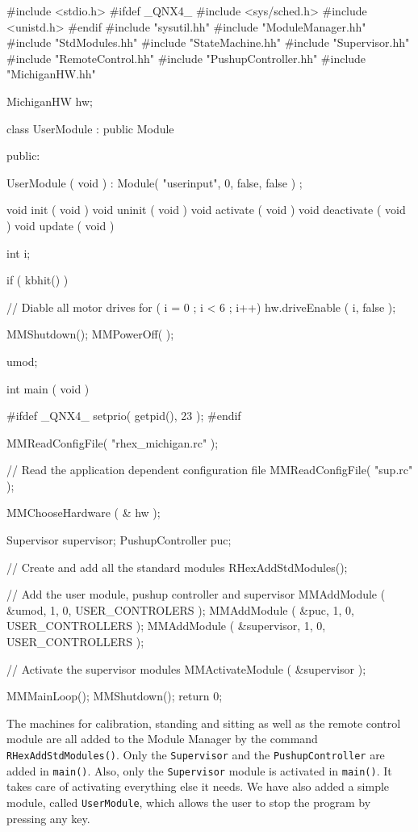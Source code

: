 \begin{codesegment}
#include <stdio.h>
#ifdef _QNX4_
#include <sys/sched.h>
#include <unistd.h>
#endif
#include "sysutil.hh"
#include "ModuleManager.hh"
#include "StdModules.hh"
#include "StateMachine.hh"
#include "Supervisor.hh"
#include "RemoteControl.hh"
#include "PushupController.hh"
#include "MichiganHW.hh"

MichiganHW hw;

class UserModule : public Module {

  public:

    UserModule ( void ) : Module( "userinput", 0, false, false ) { };

    void  init ( void ) {}
    void  uninit ( void ) {}
    void  activate ( void ) {}
    void  deactivate ( void ) {}
    void  update ( void ) {

      int i;

      if ( kbhit() ) {

        // Diable all motor drives
        for ( i = 0 ; i < 6 ; i++) 
          hw.driveEnable ( i, false );

        MMShutdown();
        MMPowerOff( );

      }
    }
} umod;

int main ( void ) {

#ifdef _QNX4_
  setprio( getpid(), 23 );
#endif

  MMReadConfigFile( "rhex_michigan.rc" );

  // Read the application dependent configuration file
  MMReadConfigFile( "sup.rc" );

  MMChooseHardware ( & hw );

  Supervisor supervisor;
  PushupController puc;

  // Create and add all the standard modules
  RHexAddStdModules();

  // Add the user module, pushup controller and supervisor
  MMAddModule ( &umod, 1, 0, USER_CONTROLERS );
  MMAddModule ( &puc, 1, 0, USER_CONTROLLERS );
  MMAddModule ( &supervisor, 1, 0, USER_CONTROLLERS );

  // Activate the supervisor modules
  MMActivateModule ( &supervisor );

  MMMainLoop();
  MMShutdown();
  return 0;

}
\end{codesegment}

The machines for calibration, standing and sitting as well as the
remote control module are all added to the Module Manager by the command {\tt
RHexAddStdModules()}. Only the {\tt Supervisor} and the {\tt PushupController}
are added in {\tt main()}. Also, only the {\tt Supervisor} module is activated
in {\tt main()}. It takes care of activating everything else it needs. We have
also added a simple module, called {\tt UserModule}, which allows the user to
stop the program by pressing any key.


